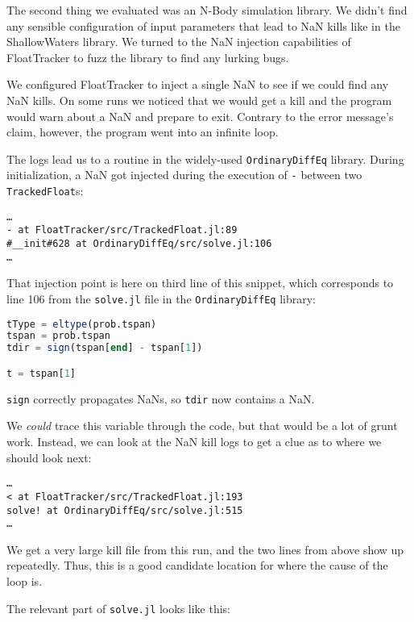 \documentclass{juliacon}
\begin{document}
The second thing we evaluated was an N-Body simulation library.
We didn't find any sensible configuration of input parameters that lead to NaN kills like in the ShallowWaters library.
We turned to the NaN injection capabilities of FloatTracker to fuzz the library to find any lurking bugs.

We configured FloatTracker to inject a single NaN to see if we could find any NaN kills.
On some runs we noticed that we would get a kill and the program would warn about a NaN and prepare to exit.
Contrary to the error message's claim, however, the program went into an infinite loop.

The logs lead us to a routine in the widely-used \texttt{OrdinaryDiffEq} library.
During initialization, a NaN got injected during the execution of \texttt{-} between two \texttt{TrackedFloat}s:

\begin{verbatim}
…
- at FloatTracker/src/TrackedFloat.jl:89
#__init#628 at OrdinaryDiffEq/src/solve.jl:106
…
\end{verbatim}

That injection point is here on third line of this snippet, which corresponds to line 106 from the \texttt{solve.jl} file in the \texttt{OrdinaryDiffEq} library:

\begin{lstlisting}[language = Julia]
tType = eltype(prob.tspan)
tspan = prob.tspan
tdir = sign(tspan[end] - tspan[1])

t = tspan[1]
\end{lstlisting}

\texttt{sign} correctly propagates NaNs, so \texttt{tdir} now contains a NaN.

We \emph{could} trace this variable through the code, but that would be a lot of grunt work.
Instead, we can look at the NaN kill logs to get a clue as to where we should look next:

\begin{verbatim}
…
< at FloatTracker/src/TrackedFloat.jl:193
solve! at OrdinaryDiffEq/src/solve.jl:515
…
\end{verbatim}

We get a very large kill file from this run, and the two lines from above show up repeatedly.
Thus, this is a good candidate location for where the cause of the loop is.

The relevant part of \texttt{solve.jl} looks like this:

\end{document}

